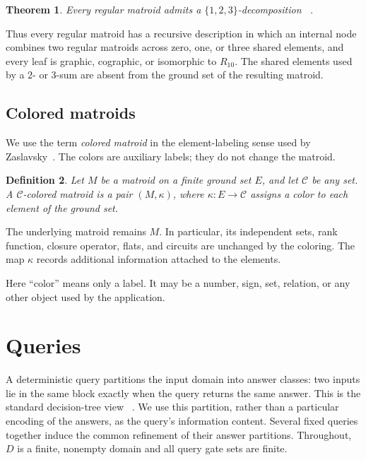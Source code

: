 \documentclass[11pt]{article}
\numberwithin{equation}{section}
\newtheorem{definition}{Definition}[section]
\newtheorem{theorem}[definition]{Theorem}
\theoremstyle{remark}
\begin{document}
\begin{theorem}
\label{thm:seymour-decomposition}
Every regular matroid admits a $\{1,2,3\}$-decomposition
~\cite{Seymour1980,Oxley2011}.
\end{theorem}

Thus every regular matroid has a recursive description in which an internal
node combines two regular matroids across zero, one, or three shared elements,
and every leaf is graphic, cographic, or isomorphic to $R_{10}$. The shared
elements used by a $2$- or $3$-sum are absent from the ground set of the
resulting matroid.

\subsection{Colored matroids}
\label{subsec:colored-matroids}

We use the term \emph{colored matroid} in the element-labeling sense used
by Zaslavsky~\cite{Zaslavsky1992}. The colors are auxiliary labels; they do
not change the matroid.

\begin{definition}
\label{def:colored-matroid}
Let $M$ be a matroid on a finite ground set $E$, and let $\mathcal C$ be any
set. A \emph{$\mathcal C$-colored matroid} is a pair $(M,\kappa)$, where
$\kappa:E\to\mathcal C$ assigns a color to each element of the ground set.
\end{definition}

The underlying matroid remains $M$. In particular, its independent sets,
rank function, closure operator, flats, and circuits are unchanged by the
coloring. The map $\kappa$ records additional information attached to the
elements.

Here ``color'' means only a label. It may be a number, sign, set, relation,
or any other object used by the application.


\section{Queries}
\label{sec:query-models}
\label{sec:queries}

A deterministic query partitions the input domain into answer classes: two
inputs lie in the same block exactly when the query returns the same answer.
This is the standard decision-tree view
~\cite{BuhrmanDeWolf2002,KothariRacicotDeslogesSantha2015}. We use this
partition, rather than a particular encoding of the answers, as the query's
information content. Several fixed queries together induce the common
refinement of their answer partitions. Throughout, $D$ is a finite,
nonempty domain and all query gate sets are finite.
\end{document}
